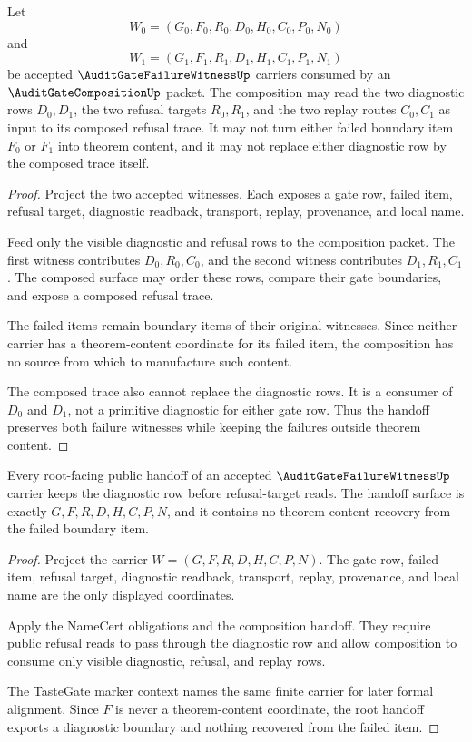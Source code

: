\begin{theorem}
\label{thm:audit-gate-failure-witness-composition-handoff}
Let
$$
W_0=(G_0,F_0,R_0,D_0,H_0,C_0,P_0,N_0)
$$
and
$$
W_1=(G_1,F_1,R_1,D_1,H_1,C_1,P_1,N_1)
$$
be accepted $\AuditGateFailureWitnessUp$ carriers consumed by an $\AuditGateCompositionUp$ packet. The composition may read the two diagnostic rows $D_0,D_1$, the two refusal targets $R_0,R_1$, and the two replay routes $C_0,C_1$ as input to its composed refusal trace. It may not turn either failed boundary item $F_0$ or $F_1$ into theorem content, and it may not replace either diagnostic row by the composed trace itself.
\end{theorem}
\begin{proof}
Project the two accepted witnesses. Each exposes a gate row, failed item, refusal target, diagnostic readback, transport, replay, provenance, and local name.

Feed only the visible diagnostic and refusal rows to the composition packet. The first witness contributes $D_0,R_0,C_0$, and the second witness contributes $D_1,R_1,C_1$. The composed surface may order these rows, compare their gate boundaries, and expose a composed refusal trace.

The failed items remain boundary items of their original witnesses. Since neither carrier has a theorem-content coordinate for its failed item, the composition has no source from which to manufacture such content.

The composed trace also cannot replace the diagnostic rows. It is a consumer of $D_0$ and $D_1$, not a primitive diagnostic for either gate row. Thus the handoff preserves both failure witnesses while keeping the failures outside theorem content.
\end{proof}

\begin{theorem}
\label{thm:audit-gate-failure-witness-root-public-handoff}
Every root-facing public handoff of an accepted $\AuditGateFailureWitnessUp$ carrier keeps the diagnostic row before refusal-target reads. The handoff surface is exactly $G,F,R,D,H,C,P,N$, and it contains no theorem-content recovery from the failed boundary item.
\end{theorem}
\begin{proof}
Project the carrier $W=(G,F,R,D,H,C,P,N)$. The gate row, failed item, refusal target, diagnostic readback, transport, replay, provenance, and local name are the only displayed coordinates.

Apply the NameCert obligations and the composition handoff. They require public refusal reads to pass through the diagnostic row and allow composition to consume only visible diagnostic, refusal, and replay rows.

The TasteGate marker context names the same finite carrier for later formal alignment. Since $F$ is never a theorem-content coordinate, the root handoff exports a diagnostic boundary and nothing recovered from the failed item.
\end{proof}

